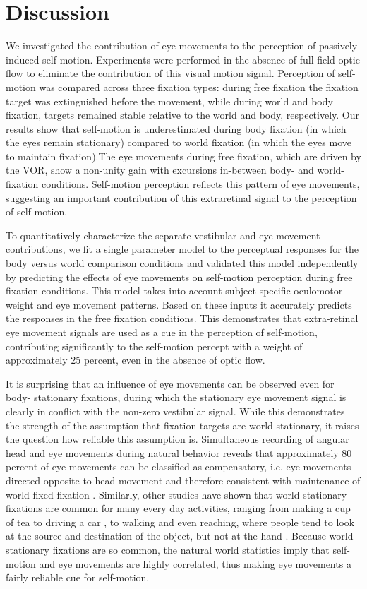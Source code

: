 \section{Discussion}

We investigated the contribution of eye movements to the perception of passively-induced self-motion. Experiments were performed in the absence of full-field optic flow to eliminate the contribution of this visual motion signal. Perception of self-motion was compared across three fixation types: during free fixation the fixation target was extinguished before the movement, while during world and body fixation, targets  remained stable relative to the world and body, respectively. Our results show that self-motion is underestimated during body fixation (in which the eyes remain stationary) compared to world fixation (in which the eyes move to maintain fixation).The eye movements during free fixation, which  are driven by the VOR, show a non-unity gain with excursions in-between body- and world-fixation conditions. Self-motion perception reflects this pattern of eye movements, suggesting an important contribution of this extraretinal signal to the perception of self-motion.

 To quantitatively characterize the separate vestibular and eye movement contributions, we fit a single parameter model to the perceptual responses for the body versus world comparison conditions and validated this model independently by predicting the effects of eye movements on self-motion perception during free fixation conditions. This model takes into account subject specific oculomotor weight and eye movement patterns. Based on these inputs it accurately predicts the responses in the free fixation conditions. This demonstrates that extra-retinal eye movement signals are used as a cue in the perception of self-motion, contributing significantly to the self-motion percept with a weight of approximately 25 percent, even in the absence of optic flow.
 
It is surprising that an influence of eye movements can be observed even for body- stationary fixations, during which the stationary eye movement signal is clearly in conflict with the non-zero vestibular signal. While this demonstrates the strength of the assumption that fixation targets are world-stationary, it raises the question how reliable this assumption is. Simultaneous recording of angular head and eye movements during natural behavior reveals that approximately 80 percent of eye movements can be classified as compensatory, i.e. eye movements directed opposite to head movement and therefore consistent with maintenance of world-fixed fixation \cite{einhauser2007}. Similarly, other studies have shown that world-stationary fixations are common for many every day activities, ranging from making a cup of tea \cite{hayhoe2014} to driving a car \cite{land1994}, to walking \cite{foulsham2011} and even reaching, where people tend to look at the source and destination of the object, but not at the hand \cite{flanagan2003}. Because world-stationary fixations are so common, the natural world statistics imply that self-motion and eye movements are highly correlated, thus making eye movements a fairly reliable cue for self-motion.

